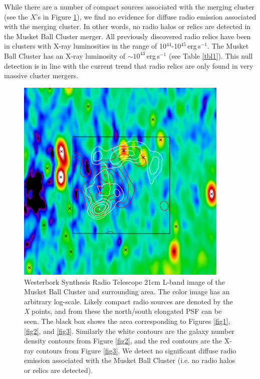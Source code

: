 While there are a number of compact sources associated with the merging cluster (see the $X$'s in Figure \ref{figure:MusketBallRadio}), we find no evidence for diffuse radio emission associated with the merging cluster.
In other words, no radio halos or relics are detected in the Musket Ball Cluster merger.
All previously discovered radio relics have been in clusters with X-ray luminosities in the range of 10$^{44}$-10$^{45}$\,erg\,s$^{-1}$.
The Musket Ball Cluster has an X-ray luminosity of $\sim 10^{43}$\,erg\,s$^{-1}$ (see Table \ref{tbl1}). 
This null detection is in line with the current trend that radio relics are only found in very massive cluster mergers.

\begin{figure}
\centering
\includegraphics[width=4in]{Chapter2/RadioWithGalaxyAndXrayContours.png}
\caption[Radio survey of the Musket Ball Cluster and surrounding area.]{
Westerbork Synthesis Radio Telescope 21cm L-band image of the Musket Ball Cluster and surrounding area.  The color image has an arbitrary log-scale.  Likely compact radio sources are denoted by the \emph{X} points, and from these the north/south elongated PSF can be seen.  The black box shows the area corresponding to Figures \ref{fig1}, \ref{fig2}, and \ref{fig3}. Similarly the white contours are the galaxy number density contours from Figure \ref{fig2}, and the red contours are the X-ray contours from Figure \ref{fig3}.  We detect no significant diffuse radio emission associated with the Musket Ball Cluster (i.e. no radio halos or relics are detected).
\label{figure:MusketBallRadio}}
\end{figure}


